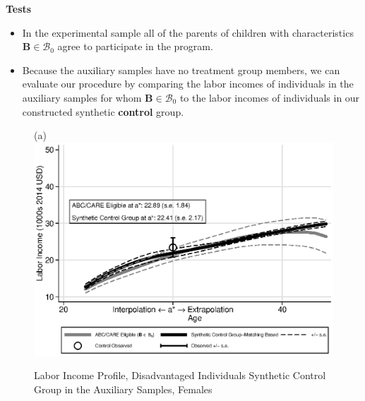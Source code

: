 \documentclass[static]{JJH-Beamer}
\begin{document}
\clearpage

\begin{frame}

\begin{center}
\textbf{Tests}
\end{center}

\begin{itemize}
\item In the experimental sample all of the parents of children with characteristics $\bm{B} \in \mathcal{B}_0$ agree to participate in the program.
\item Because the auxiliary samples have no treatment group members, we can evaluate our procedure by comparing the labor incomes of individuals in the auxiliary samples for whom $\bm{B} \in \mathcal{B}_0$ to the labor incomes of individuals in our constructed synthetic \textbf{control} group.
\end{itemize}

\end{frame}

\clearpage

\begin{frame}

\begin{figure}[H]
\caption{Labor Income Profile, Disadvantaged Individuals Synthetic Control Group in the Auxiliary Samples, Females}\label{figure:controltests}
\begin{center}
(a)\\
\includegraphics[width=.65\textwidth]{output/abccare_disad_0}
\end{center}
\end{figure}

\end{frame}
\end{document}
